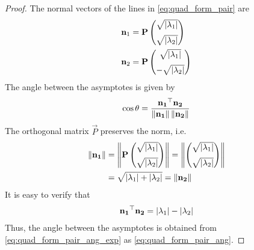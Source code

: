 \documentclass[journal,12pt,onecolumn]{IEEEtran}
\begin{document}
  \begin{proof}
The normal vectors of the lines in \eqref{eq:quad_form_pair} are 
  \begin{align} 
  \label{eq:quad_form_pair_normvecs}
  \begin{split}
  \mathbf{n}_1 &= \mathbf{P}\begin{pmatrix}\sqrt{\left\vert\lambda_1\right\vert} \\[2mm]  \sqrt{\left\vert\lambda_2\right\vert}\end{pmatrix}
  \\
  \mathbf{n}_2 &= \mathbf{P}\begin{pmatrix}\sqrt{\left\vert\lambda_1\right\vert} \\[2mm] - \sqrt{\left\vert\lambda_2\right\vert}\end{pmatrix}
  \end{split}
  \end{align} 
  The angle between the asymptotes is given by 
\begin{align} 
\label{eq:quad_form_pair_ang_exp}
\cos\theta=\frac{\mathbf{n_1}^{\top}\mathbf{n_2}}{\left\lVert\mathbf{n_1}\right\rVert\left\lVert\mathbf{n_2}\right\rVert}
\end{align} 
The orthogonal matrix $\vec{P}$ preserves the norm, i.e.
\begin{align} 
	\left\lVert\mathbf{n_1}\right\rVert &= \left\lVert\mathbf{P}\begin{pmatrix}\sqrt{\left\vert\lambda_1\right\vert} \\[2mm]  \sqrt{\left\vert\lambda_2\right\vert}\end{pmatrix}\right\rVert
	=\left\lVert\begin{pmatrix}\sqrt{\left\vert\lambda_1\right\vert} \\[2mm]  \sqrt{\left\vert\lambda_2\right\vert}\end{pmatrix}\right\rVert
	\\
	&=\sqrt{\left\vert\lambda_1\right\vert+\left\vert\lambda_2\right\vert} = \left\lVert\mathbf{n_2}\right\rVert
\end{align} 
It is easy to verify that 
\begin{align} 
\mathbf{n_1}^{\top}\mathbf{n_2} = \left\vert\lambda_1\right\vert-\left\vert\lambda_2\right\vert
\end{align} 
%
Thus, the angle between the asymptotes is obtained from \eqref{eq:quad_form_pair_ang_exp} as \eqref{eq:quad_form_pair_ang}.
  \end{proof}
%
\end{document}
